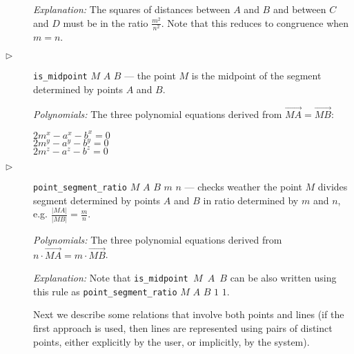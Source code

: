 \documentclass[final,1p,times,authoryear]{elsarticle}
\begin{document}
\begin{description}
{\em Explanation:} The squares of distances between $A$ and $B$ and
between $C$ and $D$ must be in the ratio $\frac{m^2}{n^2}$. Note that
this reduces to congruence when $m = n$.

\item[$\triangleright$] {\tt is\_midpoint} $M$ $A$ $B$ --- the point
  $M$ is the midpoint of the segment determined by points $A$ and
  $B$.

{\em Polynomials:} The three polynomial equations derived from $\overrightarrow{MA} = \overrightarrow{MB}$:

\begin{tabbing}
$2m^x - a^x - b^x = 0$ \\ 
$2m^y - a^y - b^y = 0$ \\ 
$2m^z - a^z - b^z = 0$
\end{tabbing}

\item[$\triangleright$] {\tt point\_segment\_ratio} $M$ $A$ $B$ $m$
  $n$ --- checks weather the point $M$ divides segment determined by
  points $A$ and $B$ in ratio determined by $m$ and $n$,
  e.g. $\frac{|MA|}{|MB|} = \frac{m}{n}$.

{\em Polynomials:} The three polynomial equations derived from
$n\cdot \overrightarrow{MA} = m\cdot \overrightarrow{MB}$.

{\em Explanation:} Note that {\tt is\_midpoint $M$ $A$ $B$} can be
also written using this rule as {\tt point\_segment\_ratio} $M$ $A$
$B$ $1$ $1$.

\bigskip

Next we describe some relations that involve both points and lines (if
the first approach is used, then lines are represented using pairs of
distinct points, either explicitly by the user, or implicitly, by the
system).



\end{description}
\end{document}
